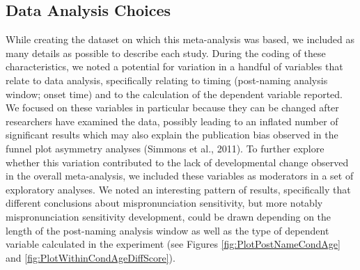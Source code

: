 \documentclass[man]{apa6}
\begin{document}
\hypertarget{data-analysis-choices}{%
\subsection{Data Analysis Choices}\label{data-analysis-choices}}

While creating the dataset on which this meta-analysis was based, we included as many details as possible to describe each study. During the coding of these characteristics, we noted a potential for variation in a handful of variables that relate to data analysis, specifically relating to timing (post-naming analysis window; onset time) and to the calculation of the dependent variable reported. We focused on these variables in particular because they can be changed after researchers have examined the data, possibly leading to an inflated number of significant results which may also explain the publication bias observed in the funnel plot asymmetry analyses (Simmons et al., 2011). To further explore whether this variation contributed to the lack of developmental change observed in the overall meta-analysis, we included these variables as moderators in a set of exploratory analyses. We noted an interesting pattern of results, specifically that different conclusions about mispronunciation sensitivity, but more notably mispronunciation sensitivity development, could be drawn depending on the length of the post-naming analysis window as well as the type of dependent variable calculated in the experiment (see Figures \ref{fig:PlotPostNameCondAge} and \ref{fig:PlotWithinCondAgeDiffScore}).
\end{document}
